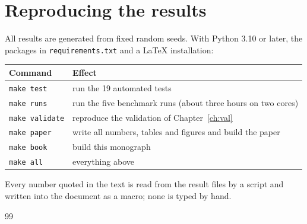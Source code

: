 \documentclass[11pt,a4paper,twoside,openany]{book}
\theoremstyle{plain}\newtheorem{proposition}{Proposition}\newtheorem{corollary}{Corollary}
\theoremstyle{definition}\newtheorem{definition}{Definition}[chapter]
\begin{document}
\chapter{Reproducing the results}\label{app:repro}
All results are generated from fixed random seeds. With Python 3.10 or later, the packages in \texttt{requirements.txt} and a LaTeX installation:
\begin{center}\begin{tabular}{@{}ll@{}}\toprule\rowcolor{dghead}
Command & Effect\\\midrule
\texttt{make test} & run the 19 automated tests\\
\texttt{make runs} & run the five benchmark runs (about three hours on two cores)\\
\texttt{make validate} & reproduce the validation of Chapter~\ref{ch:val}\\
\texttt{make paper} & write all numbers, tables and figures and build the paper\\
\texttt{make book} & build this monograph\\
\texttt{make all} & everything above\\
\bottomrule\end{tabular}\end{center}
Every number quoted in the text is read from the result files by a script and written into the document as a macro; none is typed by hand.

\backmatter
\renewcommand{\bibname}{References}
{\small
\begin{thebibliography}{99}
\setlength{\itemsep}{1pt}

\end{thebibliography}}
\clearpage

\end{document}
